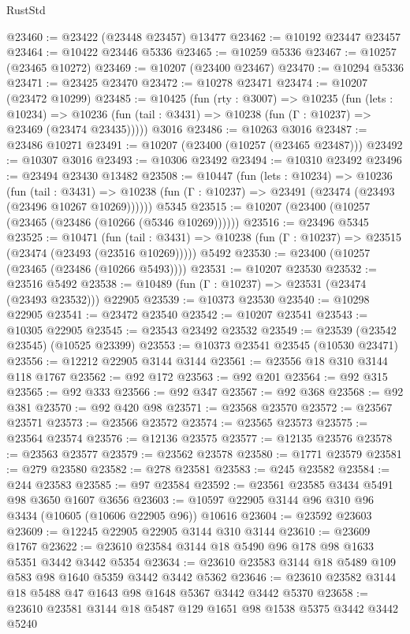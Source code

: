 \begin{lexlean}{RustStd}
\begin{coremodule}
@23460 := @23422 (@23448 @23457) @13477
@23462 := @10192 @23447 @23457
@23464 := @10422 @23446 @5336
@23465 := @10259 @5336
@23467 := @10257 (@23465 @10272)
@23469 := @10207 (@23400 @23467)
@23470 := @10294 @5336
@23471 := @23425 @23470
@23472 := @10278 @23471
@23474 := @10207 (@23472 @10299)
@23485 := @10425
    (fun (rty : @3007) =>
    @10235
      (fun (lets : @10234) =>
      @10236 (fun (tail : @3431) => @10238 (fun (Γ : @10237) => @23469 (@23474 @23435)))))
    @3016
@23486 := @10263 @3016
@23487 := @23486 @10271
@23491 := @10207 (@23400 (@10257 (@23465 @23487)))
@23492 := @10307 @3016
@23493 := @10306 @23492
@23494 := @10310 @23492
@23496 := @23494 @23430 @13482
@23508 := @10447
    (fun (lets : @10234) =>
    @10236
      (fun (tail : @3431) =>
      @10238 (fun (Γ : @10237) => @23491 (@23474 (@23493 (@23496 @10267 @10269))))))
    @5345
@23515 := @10207 (@23400 (@10257 (@23465 (@23486 (@10266 (@5346 @10269))))))
@23516 := @23496 @5345
@23525 := @10471
    (fun (tail : @3431) => @10238 (fun (Γ : @10237) => @23515 (@23474 (@23493 (@23516 @10269)))))
    @5492
@23530 := @23400 (@10257 (@23465 (@23486 (@10266 @5493))))
@23531 := @10207 @23530
@23532 := @23516 @5492
@23538 := @10489 (fun (Γ : @10237) => @23531 (@23474 (@23493 @23532))) @22905
@23539 := @10373 @23530
@23540 := @10298 @22905
@23541 := @23472 @23540
@23542 := @10207 @23541
@23543 := @10305 @22905
@23545 := @23543 @23492 @23532
@23549 := @23539 (@23542 @23545) (@10525 @23399)
@23553 := @10373 @23541 @23545 (@10530 @23471)
@23556 := @12212 @22905 @3144 @3144
@23561 := @23556 @18 @310 @3144 @118 @1767
@23562 := @92 @172
@23563 := @92 @201
@23564 := @92 @315
@23565 := @92 @333
@23566 := @92 @347
@23567 := @92 @368
@23568 := @92 @381
@23570 := @92 @420 @98
@23571 := @23568 @23570
@23572 := @23567 @23571
@23573 := @23566 @23572
@23574 := @23565 @23573
@23575 := @23564 @23574
@23576 := @12136 @23575
@23577 := @12135 @23576
@23578 := @23563 @23577
@23579 := @23562 @23578
@23580 := @1771 @23579
@23581 := @279 @23580
@23582 := @278 @23581
@23583 := @245 @23582
@23584 := @244 @23583
@23585 := @97 @23584
@23592 := @23561 @23585 @3434 @5491 @98 @3650 @1607 @3656
@23603 := @10597 @22905 @3144 @96 @310 @96 @3434 (@10605 (@10606 @22905 @96)) @10616
@23604 := @23592 @23603
@23609 := @12245 @22905 @22905 @3144 @310 @3144
@23610 := @23609 @1767
@23622 := @23610 @23584 @3144 @18 @5490 @96 @178 @98 @1633 @5351 @3442 @3442 @5354
@23634 := @23610 @23583 @3144 @18 @5489 @109 @583 @98 @1640 @5359 @3442 @3442 @5362
@23646 := @23610 @23582 @3144 @18 @5488 @47 @1643 @98 @1648 @5367 @3442 @3442 @5370
@23658 := @23610 @23581 @3144 @18 @5487 @129 @1651 @98 @1538 @5375 @3442 @3442 @5240

\end{coremodule}
\end{lexlean}
